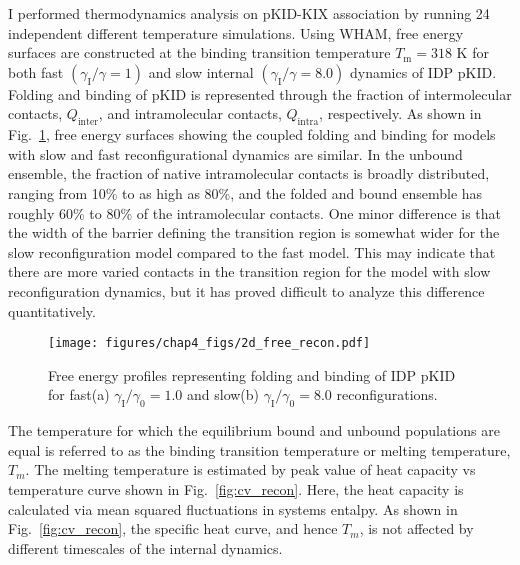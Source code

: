 \documentclass[../talant.diss.submit.tex]{subfiles}
\begin{document}
I performed thermodynamics analysis on pKID-KIX association by running 24 independent
different temperature simulations. Using WHAM, free energy surfaces 
 are constructed at the binding transition temperature $T_{\mathrm{m}}=318$
K for both fast $(\gamma_\mathrm{I}/\gamma = 1)$ and slow internal
$(\gamma_\mathrm{I}/\gamma = 8.0)$ dynamics of IDP pKID.
Folding and binding of
pKID is represented through the fraction of intermolecular contacts, $Q_{\mathrm{inter}}$, and
intramolecular contacts,
$Q_{\mathrm{intra}}$, respectively.  
As shown in Fig.~\ref{fig:2d_free_recon}, free energy surfaces showing the coupled folding and binding
for models with slow and fast reconfigurational dynamics are similar.  
In the unbound ensemble, the fraction of native intramolecular contacts is broadly distributed,
ranging from 10\% to as high as 80\%, and the folded and bound ensemble has roughly 60\% to 80\% of the
intramolecular contacts.
One minor difference is that the 
width of the barrier defining the transition region is somewhat wider for the
slow reconfiguration model compared to the fast model.
This may indicate that there are more varied contacts in the transition region for the
model with slow reconfiguration dynamics, but it has proved difficult to analyze this
difference quantitatively. 

\begin{figure}[htp!]                                                                                     
\begin{centering}                                                                                        
    \texttt{[image: figures/chap4\_figs/2d\_free\_recon.pdf]}
    \caption{Free energy profiles representing folding and binding of IDP pKID
      for fast(a) $\gamma_{\mathrm{I}}/\gamma_0 = 1.0$ and slow(b)
      $\gamma_{\mathrm{I}}/\gamma_0 = 8.0$ reconfigurations.}                    
\label{fig:2d_free_recon}                                                                                
\end{centering}                                                                                          
\end{figure}                                                                                             


The temperature for which the equilibrium bound and unbound populations are equal is referred to as
the binding transition temperature or melting temperature, $T_m$.
The melting temperature is estimated by peak value of heat capacity vs temperature
curve shown in Fig.~\ref{fig:cv_recon}. Here, the heat capacity is calculated via mean squared fluctuations
in systems entalpy. As shown in Fig.~\ref{fig:cv_recon}, the specific heat curve, and hence $T_m$, 
is not affected by different timescales of the internal dynamics. %
\end{document}
